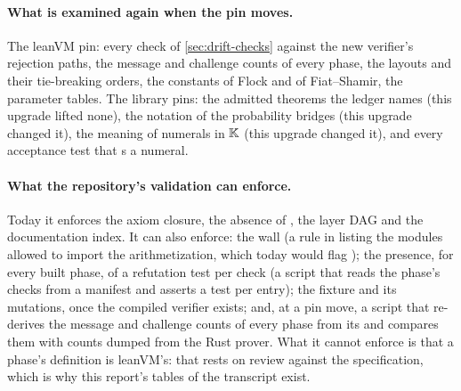 \paragraph{What is examined again when the pin moves.} The leanVM pin: every check of
\cref{sec:drift-checks} against the new verifier's rejection paths, the message and challenge
counts of every phase, the layouts and their tie-breaking orders, the constants of Flock and
of Fiat--Shamir, the parameter tables. The library pins: the admitted theorems the ledger names
(this upgrade lifted none), the notation of the probability bridges (this upgrade changed it),
the meaning of numerals in $\mathbb{K}$ (this upgrade changed it), and every acceptance test that
s a numeral.

\paragraph{What the repository's validation can enforce.} Today it enforces the axiom
closure, the absence of , the layer DAG and the documentation index. It can also
enforce: the wall (a rule in  listing the modules allowed to
import the arithmetization, which today would flag ); the presence,
for every built phase, of a refutation test per check (a script that reads the phase's checks
from a manifest and asserts a test per entry); the fixture and its mutations, once the
compiled verifier exists; and, at a pin move, a script that re-derives the message and
challenge counts of every phase from its  and compares them with counts dumped from
the Rust prover. What it cannot enforce is that a phase's definition is leanVM's: that rests
on review against the specification, which is why this report's tables of the transcript
exist.
